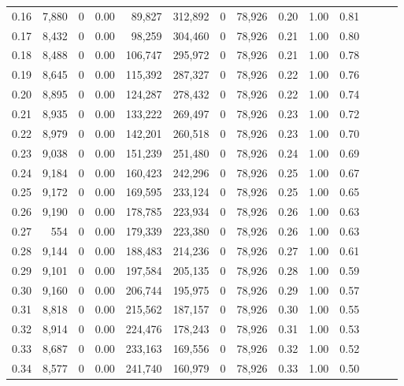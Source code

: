 \begin{tabular}{rrrrrrrrrrrrrr}
0.16 &  7,880 &      0 &  0.00 &   89,827 &  312,892 &       0 &  78,926 &  0.20 &  1.00 &      0.81 \\
0.17 &  8,432 &      0 &  0.00 &   98,259 &  304,460 &       0 &  78,926 &  0.21 &  1.00 &      0.80 \\
0.18 &  8,488 &      0 &  0.00 &  106,747 &  295,972 &       0 &  78,926 &  0.21 &  1.00 &      0.78 \\
0.19 &  8,645 &      0 &  0.00 &  115,392 &  287,327 &       0 &  78,926 &  0.22 &  1.00 &      0.76 \\
0.20 &  8,895 &      0 &  0.00 &  124,287 &  278,432 &       0 &  78,926 &  0.22 &  1.00 &      0.74 \\
0.21 &  8,935 &      0 &  0.00 &  133,222 &  269,497 &       0 &  78,926 &  0.23 &  1.00 &      0.72 \\
0.22 &  8,979 &      0 &  0.00 &  142,201 &  260,518 &       0 &  78,926 &  0.23 &  1.00 &      0.70 \\
0.23 &  9,038 &      0 &  0.00 &  151,239 &  251,480 &       0 &  78,926 &  0.24 &  1.00 &      0.69 \\
0.24 &  9,184 &      0 &  0.00 &  160,423 &  242,296 &       0 &  78,926 &  0.25 &  1.00 &      0.67 \\
0.25 &  9,172 &      0 &  0.00 &  169,595 &  233,124 &       0 &  78,926 &  0.25 &  1.00 &      0.65 \\
0.26 &  9,190 &      0 &  0.00 &  178,785 &  223,934 &       0 &  78,926 &  0.26 &  1.00 &      0.63 \\
0.27 &    554 &      0 &  0.00 &  179,339 &  223,380 &       0 &  78,926 &  0.26 &  1.00 &      0.63 \\
0.28 &  9,144 &      0 &  0.00 &  188,483 &  214,236 &       0 &  78,926 &  0.27 &  1.00 &      0.61 \\
0.29 &  9,101 &      0 &  0.00 &  197,584 &  205,135 &       0 &  78,926 &  0.28 &  1.00 &      0.59 \\
0.30 &  9,160 &      0 &  0.00 &  206,744 &  195,975 &       0 &  78,926 &  0.29 &  1.00 &      0.57 \\
0.31 &  8,818 &      0 &  0.00 &  215,562 &  187,157 &       0 &  78,926 &  0.30 &  1.00 &      0.55 \\
0.32 &  8,914 &      0 &  0.00 &  224,476 &  178,243 &       0 &  78,926 &  0.31 &  1.00 &      0.53 \\
0.33 &  8,687 &      0 &  0.00 &  233,163 &  169,556 &       0 &  78,926 &  0.32 &  1.00 &      0.52 \\
0.34 &  8,577 &      0 &  0.00 &  241,740 &  160,979 &       0 &  78,926 &  0.33 &  1.00 &      0.50 \\

\end{tabular}
